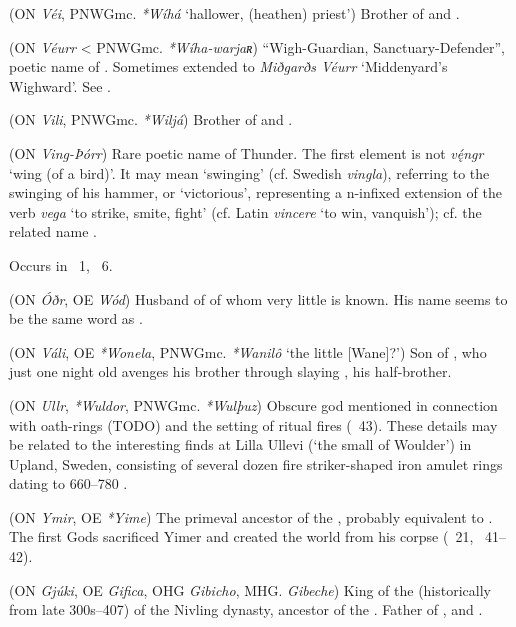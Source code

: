 \begin{itemize}
 (ON \emph{Véi}, PNWGmc. \emph{*Wíhá} ‘hallower, (heathen) priest’)
  Brother of  and .

 (ON \emph{Véurr} < PNWGmc. \emph{*Wíha-warjaʀ})
  “Wigh-Guardian, Sanctuary-Defender”, poetic name of .  Sometimes extended to \emph{Miðgarðs Véurr} ‘Middenyard’s Wighward’.  See .

 (ON \emph{Vili}, PNWGmc. \emph{*Wiljá})
  Brother of  and .

 (ON \emph{Ving-Þórr})
  Rare poetic name of Thunder.  The first element is not \emph{vę́ngr} ‘wing (of a bird)’.  It may mean ‘swinging’ (cf. Swedish \emph{vingla}), referring to the swinging of his hammer, or ‘victorious’, representing a n-infixed extension of the verb \emph{vega} ‘to strike, smite, fight’ (cf. Latin \emph{vincere} ‘to win, vanquish’); cf. the related name .

  Occurs in \Thrymskvida\ 1, \Allvismal\ 6.

 (ON \emph{Óðr}, OE \emph{Wód})
  Husband of  of whom very little is known.  His name seems to be the same word as .

 (ON \emph{Váli}, OE \emph{*Wonela}, PNWGmc. \emph{*Wanilô} ‘the little [Wane]?’)
  Son of , who just one night old avenges his brother  through slaying , his half-brother.

 (ON \emph{Ullr}, \emph{*Wuldor}, PNWGmc. \emph{*Wulþuz})
  Obscure god mentioned in connection with oath-rings (TODO) and the setting of ritual fires (\Grimnismal\ 43). These details may be related to the interesting finds at Lilla Ullevi (‘the small  of Woulder’) in Upland, Sweden, consisting of several dozen fire striker-shaped iron amulet rings dating to 660–780 \textcite{afEdholm2009}.

 (ON \emph{Ymir}, OE \emph{*Yime})
  The primeval ancestor of the , probably equivalent to .  The first Gods sacrificed Yimer and created the world from his corpse (\Vafthrudnismal\ 21, \Grimnismal\ 41–42).

 (ON \emph{Gjúki}, OE \emph{Gifica}, OHG \emph{Gibicho}, MHG. \emph{Gibeche})
  King of the  (historically from late 300s–407) of the Nivling dynasty, ancestor of the . Father of ,  and .
\end{itemize}

